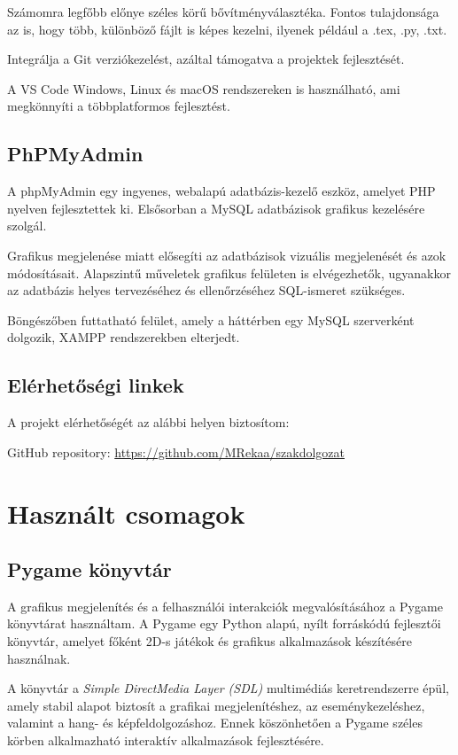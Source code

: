 \documentclass[]{thesis-ekf}
\begin{document}
	Számomra legfőbb előnye széles körű bővítményválasztéka. Fontos tulajdonsága az is, hogy több, különböző fájlt is képes kezelni, ilyenek például a .tex, .py, .txt.
	
	Integrálja a Git verziókezelést, azáltal támogatva a projektek fejlesztését.
	
	A VS Code Windows, Linux és macOS rendszereken is használható, ami megkönnyíti a többplatformos fejlesztést.
	
	\subsection{PhPMyAdmin}
	
	A phpMyAdmin\cite{phpMyAdmin} egy ingyenes, webalapú adatbázis-kezelő eszköz, amelyet PHP nyelven fejlesztettek ki. Elsősorban a MySQL adatbázisok grafikus kezelésére szolgál.
	
	Grafikus megjelenése miatt elősegíti az adatbázisok vizuális megjelenését és azok módosításait. Alapszintű műveletek grafikus felületen is elvégezhetők, ugyanakkor az adatbázis helyes tervezéséhez és ellenőrzéséhez SQL-ismeret szükséges.
	
	Böngészőben futtatható felület, amely a háttérben egy MySQL szerverként dolgozik, XAMPP\cite{Apache} rendszerekben elterjedt.
	
	\subsection{Elérhetőségi linkek}
	
	A projekt elérhetőségét az alábbi helyen biztosítom:
	
	GitHub repository: \url{https://github.com/MRekaa/szakdolgozat} 
	
	\section{Használt csomagok} 
	
	\subsection{Pygame könyvtár}
	
	A grafikus megjelenítés és a felhasználói interakciók megvalósításához a Pygame\cite{PyGame2} könyvtárat használtam. A Pygame egy Python alapú, nyílt forráskódú fejlesztői könyvtár, amelyet főként 2D-s játékok és grafikus alkalmazások készítésére használnak.
	
	A könyvtár a \textit{Simple DirectMedia Layer (SDL)}\cite{SDL} multimédiás keretrendszerre épül, amely stabil alapot biztosít a grafikai megjelenítéshez, az eseménykezeléshez, valamint a hang- és képfeldolgozáshoz. Ennek köszönhetően a Pygame széles körben alkalmazható interaktív alkalmazások fejlesztésére.
	
\end{document}
